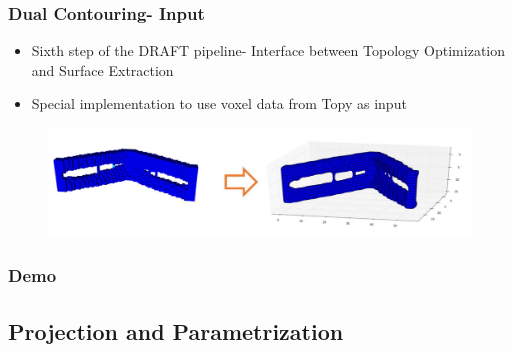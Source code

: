 \begin{frame}

	\frametitle{Dual Contouring- Input}
	
	\begin{itemize}
	\item  Sixth step of the DRAFT pipeline- Interface between Topology Optimization and Surface Extraction
	\item Special implementation to use voxel data from Topy as input
	\end{itemize}
	\begin{figure}
	\includegraphics[scale=0.35]{Pictures/DC/cantilever.pdf}
	\end{figure}
	
\end{frame}

\begin{frame}

	\frametitle{Demo}
	

\end{frame}

\subsection{Projection and Parametrization}

